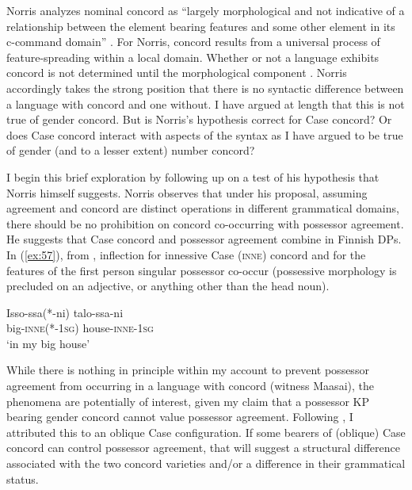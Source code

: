 \documentclass[output=paper
,modfonts
,nonflat]{langsci/langscibook}
\begin{document}
Norris analyzes nominal concord as “largely morphological and not indicative of a relationship between the element bearing features and some other element in its c-command domain” \citep[98]{Norris2014}. For Norris, concord results from a universal process of feature-spreading within a local domain. Whether or not a language exhibits concord is not determined until the morphological component \citep[132]{Norris2014}. Norris accordingly takes the strong position that there is no syntactic difference between a language with concord and one without. I have argued at length that this is not true of gender concord. But is Norris's hypothesis correct for Case concord? Or does Case concord interact with aspects of the syntax as I have argued to be true of gender (and to a lesser extent) number concord?

I begin this brief exploration by following up on a test of his hypothesis that Norris himself suggests. Norris observes that under his proposal, assuming agreement and concord are distinct operations in different grammatical domains, there should be no prohibition on concord co-occurring with possessor agreement. He suggests that Case concord and possessor agreement combine in Finnish DPs. In (\ref{ex:57}), from \citet[163]{Norris2014}, inflection for innessive Case (\textsc{inne}) concord and for the features of the first person singular possessor co-occur (possessive morphology is precluded on an adjective, or anything other than the head noun).

\begin{exe}
\ex \label{ex:57}
\gll Isso-ssa(*-ni)     talo-ssa-ni\\
big-\textsc{inne}(*-1\textsc{sg}) house-\textsc{inne}{}-1\textsc{sg}\\
\glt `in my big house'
\end{exe}
While there is nothing in principle within my account to prevent possessor agreement from occurring in a language with concord (witness Maasai), the phenomena are potentially of interest, given my claim that a possessor KP bearing gender concord cannot value possessor agreement. Following \citet{Toosarvandani_Van_Urk2014}, I attributed this to an oblique Case configuration. If some bearers of (oblique) Case concord can control possessor agreement, that will suggest a structural difference associated with the two concord varieties and/or a difference in their grammatical status. 
\end{document}
